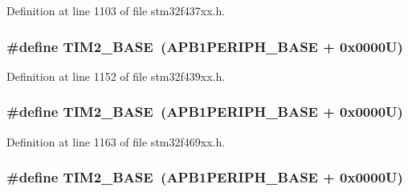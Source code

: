 Definition at line 1103 of file stm32f437xx.\+h.

\subsubsection[{\texorpdfstring{T\+I\+M2\+\_\+\+B\+A\+SE}{TIM2_BASE}}]{\setlength{\rightskip}{0pt plus 5cm}\#define T\+I\+M2\+\_\+\+B\+A\+SE~({\bf A\+P\+B1\+P\+E\+R\+I\+P\+H\+\_\+\+B\+A\+SE} + 0x0000\+U)}\hypertarget{group___peripheral__memory__map_ga00d0fe6ad532ab32f0f81cafca8d3aa5}{}\label{group___peripheral__memory__map_ga00d0fe6ad532ab32f0f81cafca8d3aa5}


Definition at line 1152 of file stm32f439xx.\+h.

\subsubsection[{\texorpdfstring{T\+I\+M2\+\_\+\+B\+A\+SE}{TIM2_BASE}}]{\setlength{\rightskip}{0pt plus 5cm}\#define T\+I\+M2\+\_\+\+B\+A\+SE~({\bf A\+P\+B1\+P\+E\+R\+I\+P\+H\+\_\+\+B\+A\+SE} + 0x0000\+U)}\hypertarget{group___peripheral__memory__map_ga00d0fe6ad532ab32f0f81cafca8d3aa5}{}\label{group___peripheral__memory__map_ga00d0fe6ad532ab32f0f81cafca8d3aa5}


Definition at line 1163 of file stm32f469xx.\+h.

\subsubsection[{\texorpdfstring{T\+I\+M2\+\_\+\+B\+A\+SE}{TIM2_BASE}}]{\setlength{\rightskip}{0pt plus 5cm}\#define T\+I\+M2\+\_\+\+B\+A\+SE~({\bf A\+P\+B1\+P\+E\+R\+I\+P\+H\+\_\+\+B\+A\+SE} + 0x0000\+U)}\hypertarget{group___peripheral__memory__map_ga00d0fe6ad532ab32f0f81cafca8d3aa5}{}\label{group___peripheral__memory__map_ga00d0fe6ad532ab32f0f81cafca8d3aa5}


